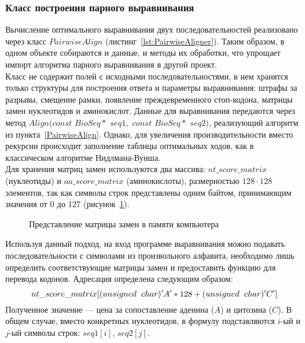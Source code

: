 \subsubsection[Класс построения парного выравнивания]{\large Класс построения парного выравнивания}
\hspace{\parindent} Вычисление оптимального выравнивания двух последовательностей реализовано через  класс $PairwiseAlign$ (листинг~\ref{lst:PairwiseAligner}). Таким образом, в одном объекте собираются и данные, и методы их обработки, что упрощает импорт алгоритма парного выравнивания в другой проект.\\
\indent Класс не содержит полей с исходными последовательностями, в нем хранятся только структуры для построения ответа и параметры выравнивания: штрафы за разрывы, смещение рамки, появление преждевременного стоп-кодона, матрицы замен нуклеотидов и аминокислот. Данные для выравнивания передаются через метод $Align(const$ $BioSeq*$ $seq1,$ $const$ $BioSeq*$ $seq2)$, реализующий алгоритм из пункта~\ref{PairwiseAlign}. Однако, для увеличения производительности вместо рекурсии происходит заполнение таблицы оптимальных ходов, как в классическом алгоритме Нидлмана-Вунша.\\
\indent Для хранения матриц замен используются два массива: $nt\_score\_matrix$ (нуклеотиды) и $aa\_score\_matrix$ (аминокислоты), размерностью $128\cdot 128$ элементов, так как символы строк представлены одним байтом, принимающим значения от 0 до 127 (рисунок~\ref{ris:memory}).
\begin{figure}[H]
	\caption{Представление матрицы замен в памяти компьютера}
	\label{ris:memory}
\end{figure}
\indent Используя данный подход, на вход программе выравнивания можно подавать последовательности с символами из произвольного алфавита, необходимо лишь определить соответствующие матрицы замен и предоставить функцию для перевода кодонов. Адресация определена следующим образом:
\begin{equation*}
nt\_score\_matrix[(unsigned\hspace{0.2cm} char)'A'*128+(unsigned\hspace{0.2cm} char)'C']
\end{equation*}
Полученное значение --- цена за сопоставление аденина ($A$) и цитозина ($C$). В общем случае, вместо конкретных нуклеотидов, в формулу подставляются $i$-ый и $j$-ый символы строк: $seq1[i]$, $seq2[j]$.

